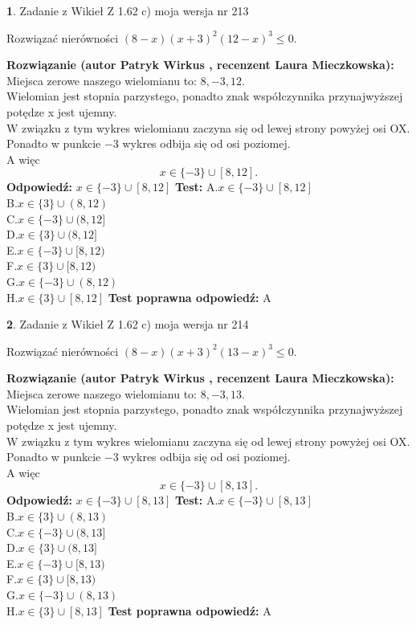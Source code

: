 \documentclass[12pt, a4paper]{article}
\theoremstyle{definition} %
\newtheorem{zad}{}
\newcommand{\zadStart}[1]{\begin{zad}#1\newline}
\newcommand{\zadStop}{\end{zad}}
\newcommand{\rozwStart}[2]{\noindent \textbf{Rozwiązanie (autor #1 , recenzent #2): }\newline}
\newcommand{\rozwStop}{\newline}
\newcommand{\odpStart}{\noindent \textbf{Odpowiedź:}\newline}
\newcommand{\odpStop}{\newline}
\newcommand{\testStart}{\noindent \textbf{Test:}\newline}
\newcommand{\testStop}{\newline}
\newcommand{\kluczStart}{\noindent \textbf{Test poprawna odpowiedź:}\newline}
\newcommand{\kluczStop}{\newline}
\begin{document}
\zadStart{Zadanie z Wikieł Z 1.62 c) moja wersja nr 213}

Rozwiązać nierówności $(8-x)(x+3)^{2}(12-x)^{3}\le0$.
\zadStop
\rozwStart{Patryk Wirkus}{Laura Mieczkowska}
Miejsca zerowe naszego wielomianu to: $8, -3, 12$.\\
Wielomian jest stopnia parzystego, ponadto znak współczynnika przy\linebreak najwyższej potędze x jest ujemny.\\ W związku z tym wykres wielomianu zaczyna się od lewej strony powyżej osi OX.\\
Ponadto w punkcie $-3$ wykres odbija się od osi poziomej.\\
A więc $$x \in \{-3\} \cup [8,12].$$
\rozwStop
\odpStart
$x \in \{-3\} \cup [8,12]$
\odpStop
\testStart
A.$x \in \{-3\} \cup [8,12]$\\
B.$x \in \{3\} \cup (8,12)$\\
C.$x \in \{-3\} \cup (8,12]$\\
D.$x \in \{3\} \cup (8,12]$\\
E.$x \in \{-3\} \cup [8,12)$\\
F.$x \in \{3\} \cup [8,12)$\\
G.$x \in \{-3\} \cup (8,12)$\\
H.$x \in \{3\} \cup [8,12]$
\testStop
\kluczStart
A
\kluczStop



\zadStart{Zadanie z Wikieł Z 1.62 c) moja wersja nr 214}

Rozwiązać nierówności $(8-x)(x+3)^{2}(13-x)^{3}\le0$.
\zadStop
\rozwStart{Patryk Wirkus}{Laura Mieczkowska}
Miejsca zerowe naszego wielomianu to: $8, -3, 13$.\\
Wielomian jest stopnia parzystego, ponadto znak współczynnika przy\linebreak najwyższej potędze x jest ujemny.\\ W związku z tym wykres wielomianu zaczyna się od lewej strony powyżej osi OX.\\
Ponadto w punkcie $-3$ wykres odbija się od osi poziomej.\\
A więc $$x \in \{-3\} \cup [8,13].$$
\rozwStop
\odpStart
$x \in \{-3\} \cup [8,13]$
\odpStop
\testStart
A.$x \in \{-3\} \cup [8,13]$\\
B.$x \in \{3\} \cup (8,13)$\\
C.$x \in \{-3\} \cup (8,13]$\\
D.$x \in \{3\} \cup (8,13]$\\
E.$x \in \{-3\} \cup [8,13)$\\
F.$x \in \{3\} \cup [8,13)$\\
G.$x \in \{-3\} \cup (8,13)$\\
H.$x \in \{3\} \cup [8,13]$
\testStop
\kluczStart
A
\kluczStop
\end{document}
